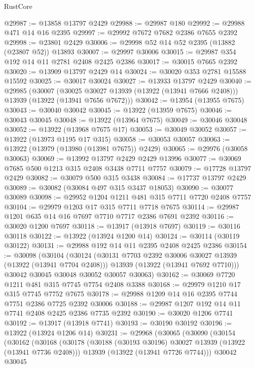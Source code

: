 \begin{lexlean}{RustCore}
\begin{coremodule}
@29987 := @13858 @13797 @2429
@29988 := @29987 @180
@29992 := @29988 @471 @14 @16 @2395
@29997 := @29992 @7672 @7682 @2386 @7655 @2392
@29998 := @23801 @2429
@30006 := @29998 @52 @14 @52 @2395 (@13882 (@23807 @52)) @13893
@30007 := @29997 @30006
@30015 := @29987 @354 @192 @14 @11 @2781 @2408 @2425 @2386
@30017 := @30015 @7665 @2392
@30020 := @13909 @13797 @2429 @14
@30024 := @30020 @353 @2781 @15588 @15592
@30025 := @30017 @30024
@30027 := @13933 @13797 @2429
@30040 := @29985
    (@30007
      (@30025 @30027 @13939 (@13922 (@13941 @7666 @2408)))
      @13939
      (@13922 (@13941 @7656 @7672)))
@30042 := @13954 (@13955 @7675)
@30043 := @30040 @30042
@30045 := @13922 (@13959 @7675)
@30046 := @30043 @30045
@30048 := @13922 (@13964 @7675)
@30049 := @30046 @30048
@30052 := @13922 (@13968 @7675 @17)
@30053 := @30049 @30052
@30057 := @13922 (@13973 @1195 @17 @315)
@30058 := @30053 @30057
@30063 := @13922 (@13979 (@13980 (@13981 @7675)) @2429)
@30065 := @29976 (@30058 @30063)
@30069 := @13992 @13797 @2429 @2429 @13996
@30077 := @30069 @7685 @500 @1213 @315 @2408 @3438 @7711 @7757
@30079 := @17728 @13797 @2429
@30082 := @30079 @500 @315 @3438
@30084 := @17737 @13797 @2429
@30089 := @30082 (@30084 @497 @315 @3437 @18053)
@30090 := @30077 @30089
@30098 := @29952 @1204 @1211 @481 @315 @7711 @7720 @2408 @7757
@30104 := @29979 @1203 @17 @315 @7711 @7718 @7675
@30114 := @29987 @1201 @635 @14 @16 @7697 @7710 @7717 @2386 @7691 @2392
@30116 := @30020 @1200 @7697
@30118 := @13917 (@13918 @7697)
@30119 := @30116 @30118
@30122 := @13922 (@13924 @1200 @14)
@30124 := @30114 (@30119 @30122)
@30131 := @29988 @192 @14 @11 @2395 @2408 @2425 @2386
@30154 := @30098
    (@30104
      (@30124
        (@30131 @7703 @2392 @30006 @30027 @13939 (@13922 (@13941 @7704 @2408)))
        @13939
        (@13922 (@13941 @7692 @7710)))
      @30042
      @30045
      @30048
      @30052
      @30057
      @30063)
@30162 := @30069 @7720 @1211 @481 @315 @7745 @7754 @2408 @3388
@30168 := @29979 @1210 @17 @315 @7745 @7752 @7675
@30178 := @29988 @1209 @14 @16 @2395 @7744 @7751 @2386 @7725 @2392 @30006
@30188 := @29987 @1207 @192 @14 @11 @7741 @2408 @2425 @2386 @7735 @2392
@30190 := @30020 @1206 @7741
@30192 := @13917 (@13918 @7741)
@30193 := @30190 @30192
@30196 := @13922 (@13924 @1206 @14)
@30231 := @29968
    (@30065
      (@30090
        (@30154
          (@30162
            (@30168
              (@30178
                (@30188 (@30193 @30196) @30027 @13939 (@13922 (@13941 @7736 @2408)))
                @13939
                (@13922 (@13941 @7726 @7744)))
              @30042
              @30045

\end{coremodule}
\end{lexlean}
